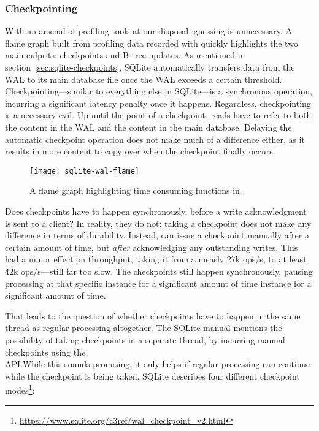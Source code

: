 \subsubsection{Checkpointing}

With an arsenal of profiling tools at our disposal, guessing is unnecessary. A
flame graph built from profiling data recorded with  quickly
highlights the two main culprits: checkpoints and B-tree updates. As mentioned
in section~\ref{sec:sqlite-checkpoints}, SQLite automatically transfers data
from the WAL to its main database file once the WAL exceeds a certain threshold.
Checkpointing---similar to everything else in SQLite---is a synchronous
operation, incurring a significant latency penalty once it happens. Regardless,
checkpointing is a necessary evil. Up until the point of a checkpoint, reads
have to refer to both the content in the WAL and the content in the main
database. Delaying the automatic checkpoint operation does not make much of a
difference either, as it results in more content to copy over when the
checkpoint finally occurs.

\begin{figure}[H]
  \centering
  \texttt{[image: sqlite-wal-flame]}
  \caption{A flame graph highlighting time consuming functions in
  .}\label{fig:sqlite-wal}
\end{figure}

Does checkpoints have to happen synchronously, before a write acknowledgment is
sent to a client? In reality, they do not: taking a checkpoint does not make any
difference in terms of durability. Instead,  can issue a
checkpoint manually after a certain amount of time, but \textit{after}
acknowledging any outstanding writes. This had a minor effect on throughput,
taking it from a measly 27k ops/s, to at least 42k ops/s---still far too slow.
The checkpoints still happen synchronously, pausing processing at that specific
 instance for a significant amount of time instance for a
significant amount of time.

That leads to the question of whether checkpoints have to happen in the same
thread as regular processing altogether. The SQLite manual mentions the
possibility of taking checkpoints in a separate thread, by incurring manual
checkpoints using the \\  API.\@ While this
sounds promising, it only helps if regular processing can continue while the
checkpoint is being taken. SQLite describes four different checkpoint
modes\footnote{\url{https://www.sqlite.org/c3ref/wal_checkpoint_v2.html}}:

